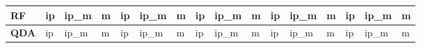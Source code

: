 \begin{table}[htbp]
{\begin{tabular}{l|lll|lll|lll|lll|lll}
\hline
\hline

\hline
\textbf{RF}  & ip         & ip\_m      & m          & ip         & ip\_m      & m          & ip         & ip\_m      & m          & ip         & ip\_m      & m          & ip         & ip\_m      & m           \\
\hline

\hline
\hline

\hline
\textbf{QDA} & ip         & ip\_m      & m          & ip         & ip\_m      & m          & ip         & ip\_m      & m          & ip         & ip\_m      & m          & ip         & ip\_m      & m           \\
\hline

\hline
\hline
\end{tabular}

  }
\end{table}